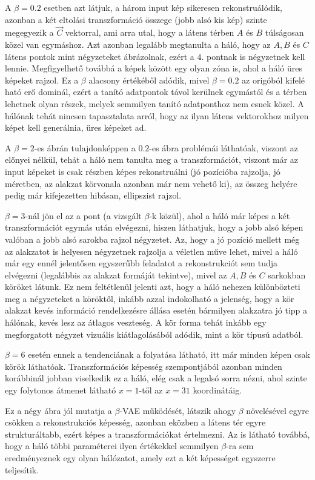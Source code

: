 A $\beta=0.2$ esetben azt látjuk, a három input kép sikeresen rekonstruálódik, azonban a két eltolási transzformáció összege (jobb alsó kis kép) szinte megegyezik a $\vec{C}$ vektorral, ami arra utal, hogy a látens térben $A$ és $B$ túlságosan közel van egymáshoz. Azt azonban legalább megtanulta a háló, hogy az $A, B$ és $C$ látens pontok mint négyzeteket ábrázolnak, ezért a $4$. pontnak is négyzetnek kell lennie. Megfigyelhető továbbá a képek között egy olyan zóna is, ahol a háló üres képeket rajzol. Ez a $\beta$ alacsony értékéből adódik, mivel $\beta=0.2$ az origóból kifelé ható erő dominál, ezért a tanító adatpontok távol kerülnek egymástól és a térben lehetnek olyan részek, melyek semmilyen tanító adatponthoz nem esnek közel. A hálónak tehát nincsen tapasztalata arról, hogy az ilyan látens vektorokhoz milyen képet kell generálnia, üres képeket ad.

A $\beta=2$-es ábrán tulajdonképpen a $0.2$-es ábra problémái láthatóak, viszont az előnyei nélkül, tehát a háló nem tanulta meg a transzformációt, viszont már az input képeket is csak részben képes rekonstruálni (jó pozícióba rajzolja, jó méretben, az alakzat körvonala azonban már nem vehető ki), az összeg helyére pedig már kifejezetten hibásan, ellipszist rajzol.

$\beta=3$-nál jön el az a pont (a vizsgált $\beta$-k közül), ahol a háló már képes a két transzformációt egymás után elvégezni, hiszen láthatjuk, hogy a jobb alsó képen valóban a jobb alsó sarokba rajzol négyzetet. Az, hogy a jó pozíció mellett még az alakzatot is helyesen négyzetnek rajzolja a véletlen műve lehet, mivel a háló már egy ennél jelentősen egyszerűbb feladatot a rekonstrukciót sem tudja elvégezni (legalábbis az alakzat formáját tekintve), mivel az $A, B$ és $C$ sarkokban köröket látunk. Ez nem feltétlenül jelenti azt, hogy a háló nehezen különbözteti meg a négyzeteket a köröktől, inkább azzal indokolható a jelenség, hogy a kör alakzat kevés információ rendelkezésre állása esetén bármilyen alakzatra jó tipp a hálónak, kevés lesz az átlagos veszteség. A kör forma tehát inkább egy megforgatott négyzet vizuális kiátlagolásából adódik, mint a kör típusú adatból.

$\beta=6$ esetén ennek a tendenciának a folyatása látható, itt már minden képen csak körök láthatóak. Transzformációs képesség szempontjából azonban minden korábbinál jobban viselkedik ez a háló, elég csak a legalsó sorra nézni, ahol szinte egy folytonos átmenet látható $x=1$-től az $x=31$ koordinátáig.

Ez a négy ábra jól mutatja a $\beta$-VAE működését, látszik ahogy $\beta$ növelésével egyre csökken a rekonstrukciós képesség, azonban eközben a látens tér egyre strukturáltabb, ezért képes a transzformációkat értelmezni. Az is látható továbbá, hogy a háló többi paraméterei ilyen értékekkel semmilyen $\beta$-ra sem eredményeznek egy olyan hálózatot, amely ezt a két képességet egyszerre teljesítik.



